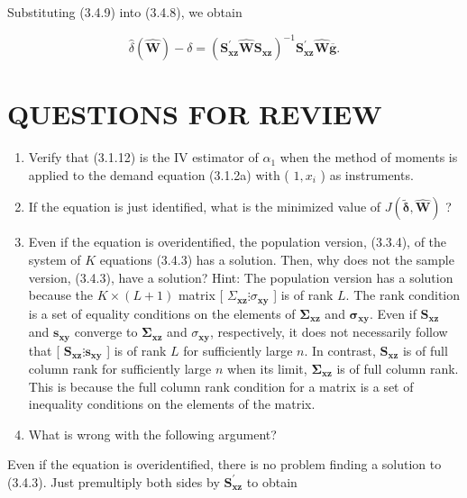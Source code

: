 \documentclass[10pt]{article}
\begin{document}
Substituting (3.4.9) into (3.4.8), we obtain


\begin{equation*}
\hat{\delta}(\widehat{\mathbf{W}})-\delta=\left(\mathbf{S}_{\mathbf{x z}}^{\prime} \widehat{\mathbf{W}} \mathbf{S}_{\mathbf{x z}}\right)^{-1} \mathbf{S}_{\mathbf{x z}}^{\prime} \widehat{\mathbf{W}} \overline{\mathbf{g}} . \tag{3.4.11}
\end{equation*}


\section*{QUESTIONS FOR REVIEW}
\begin{enumerate}
  \item Verify that (3.1.12) is the IV estimator of $\alpha_{1}$ when the method of moments is applied to the demand equation (3.1.2a) with ( $1, x_{i}$ ) as instruments.
  \item If the equation is just identified, what is the minimized value of $J(\tilde{\boldsymbol{\delta}}, \widehat{\mathbf{W}})$ ?
  \item Even if the equation is overidentified, the population version, (3.3.4), of the system of $K$ equations (3.4.3) has a solution. Then, why does not the sample version, (3.4.3), have a solution? Hint: The population version has a solution\\
because the $K \times(L+1)$ matrix [ $\Sigma_{\mathbf{x z}} \vdots \sigma_{\mathbf{x y}}$ ] is of rank $L$. The rank condition is a set of equality conditions on the elements of $\boldsymbol{\Sigma}_{\mathbf{x z}}$ and $\boldsymbol{\sigma}_{\mathbf{x y}}$. Even if $\mathbf{S}_{\mathbf{x z}}$ and $\mathbf{s}_{\mathbf{x y}}$ converge to $\boldsymbol{\Sigma}_{\mathbf{x z}}$ and $\sigma_{\mathbf{x y}}$, respectively, it does not necessarily follow that [ $\mathbf{S}_{\mathbf{x z}} \vdots \mathbf{s}_{\mathbf{x y}}$ ] is of rank $L$ for sufficiently large $n$. In contrast, $\mathbf{S}_{\mathbf{x z}}$ is of full column rank for sufficiently large $n$ when its limit, $\boldsymbol{\Sigma}_{\mathbf{x z}}$ is of full column rank. This is because the full column rank condition for a matrix is a set of inequality conditions on the elements of the matrix.
  \item What is wrong with the following argument?
\end{enumerate}

Even if the equation is overidentified, there is no problem finding a solution to (3.4.3). Just premultiply both sides by $\mathbf{S}_{\mathbf{x z}}^{\prime}$ to obtain
\end{document}

